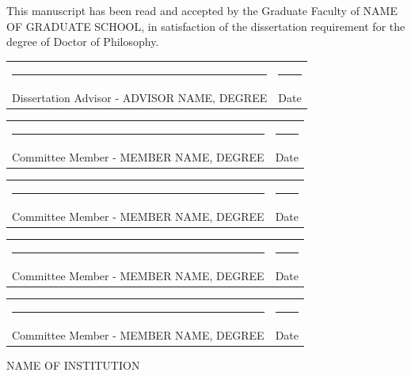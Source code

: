\noindent
This manuscript has been read and accepted by the Graduate Faculty of NAME OF GRADUATE SCHOOL, in satisfaction of the dissertation requirement for the degree of Doctor of Philosophy.

\vspace{2em}

\newcommand{\sigline}[2]{%
\noindent
\begin{tabular}{@{}m{3in}@{\hspace{1.5in}}m{1.5in}@{}}
\rule{3in}{0.4pt} & \rule{1.5in}{0.4pt} \\
\small#1 & \small#2
\end{tabular}
\vspace{1.2em}
}

\sigline{Dissertation Advisor - ADVISOR NAME, DEGREE}{Date}
\sigline{Committee Member - MEMBER NAME, DEGREE}{Date}
\sigline{Committee Member - MEMBER NAME, DEGREE}{Date}
\sigline{Committee Member - MEMBER NAME, DEGREE}{Date}
\sigline{Committee Member - MEMBER NAME, DEGREE}{Date}

\vfill

\begin{center}
NAME OF INSTITUTION
\end{center}
